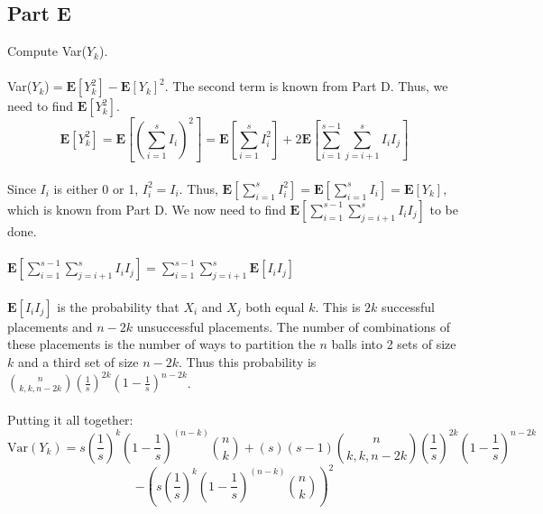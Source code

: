 \documentclass{amsart}
\begin{document}
	\subsection{Part E}
	Compute Var($Y_k$).\\
	\\
	Var($Y_k$)$= \textbf{E}[Y_k^2] - \textbf{E}[Y_k]^2$. The second term is known from Part D. Thus, we need to find $\textbf{E}[Y_k^2]$.\\
	\[
		\textbf{E}[Y_k^2] = \textbf{E}\left[\left( \sum_{i=1}^{s}I_i\right)^2\right]
		=
		\textbf{E}\left[
		\sum_{i=1}^{s}I_i^2\right] + 2\textbf{E}\left[ \sum_{i=1}^{s-1}\sum_{j=i+1}^{s}I_iI_j
		\right]
	\]\\
	Since $I_i$ is either 0 or 1, $I_i^2 = I_i$. Thus, 
	$\textbf{E}\left[\sum_{i=1}^{s}I_i^2\right] = \textbf{E}\left[\sum_{i=1}^{s}I_i\right] = \textbf{E}[Y_k]$, which is known from Part D. We now need to find $\textbf{E}\left[\sum_{i=1}^{s-1}\sum_{j=i+1}^{s}I_iI_j
	\right]$ to be done.\\
	\\
	$\textbf{E}\left[\sum_{i=1}^{s-1}\sum_{j=i+1}^{s}I_iI_j
	\right] = \sum_{i=1}^{s-1}\sum_{j=i+1}^{s}\textbf{E}\left[I_iI_j
	\right]$\\\\
	$\textbf{E}\left[I_iI_j\right]$ is the probability that $X_i$ and $X_j$ both equal $k$. This is $2k$ successful placements and $n-2k$ unsuccessful placements. The number of combinations of these placements is the number of ways to partition the $n$ balls into 2 sets of size $k$ and a third set of size $n-2k$. Thus this probability is $\binom{n}{k,k,n-2k}\left(\frac{1}{s}\right)^{2k}\left(1-\frac{1}{s}\right)^{n-2k}$.\\
	\\
	Putting it all together:
	\[
	\text{Var}(Y_k) = s \left(\frac{1}{s}\right)^k\left(1-\frac{1}{s}\right)^{(n-k)}\binom{n}{k} + 
	(s)(s-1)\binom{n}{k,k,n-2k}\left(\frac{1}{s}\right)^{2k}\left(1-\frac{1}{s}\right)^{n-2k}\]
	\[-\left(s \left(\frac{1}{s}\right)^k\left(1-\frac{1}{s}\right)^{(n-k)}\binom{n}{k}
	\right)^2
	\]
	
	
		
\end{document}

